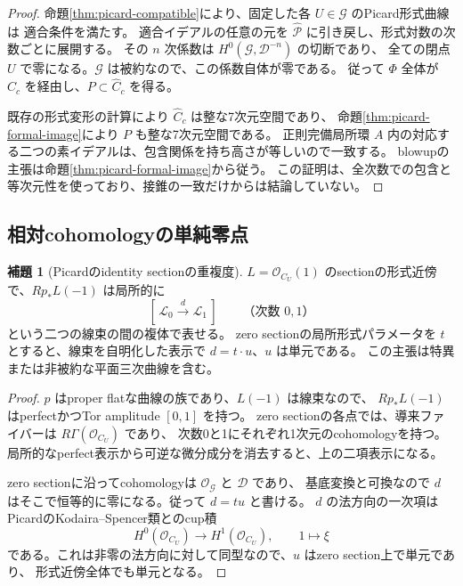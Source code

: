 \documentclass[a4paper,11pt]{ltjsarticle}
\theoremstyle{definition}
\newtheorem{lemma}[theorem]{補題}
\newcommand{\OO}{\mathcal O}
\begin{document}
\begin{proof}
命題\ref{thm:picard-compatible}により、固定した各 $U\in\mathcal G$ のPicard形式曲線は
適合条件を満たす。
適合イデアルの任意の元を $\widehat{\mathcal P}$ に引き戻し、形式対数の次数ごとに展開する。
その $n$ 次係数は $H^0(\mathcal G,\mathcal D^{-n})$ の切断であり、
全ての閉点 $U$ で零になる。$\mathcal G$ は被約なので、この係数自体が零である。
従って $\Phi$ 全体が $\widehat C_c$ を経由し、$P\subset\widehat C_c$ を得る。

既存の形式変形の計算により $\widehat C_c$ は整な7次元空間であり、
命題\ref{thm:picard-formal-image}により $P$ も整な7次元空間である。
正則完備局所環 $A$ 内の対応する二つの素イデアルは、包含関係を持ち高さが等しいので一致する。
blowupの主張は命題\ref{thm:picard-formal-image}から従う。
この証明は、全次数での包含と等次元性を使っており、接錐の一致だけからは結論していない。
\end{proof}

\subsection{相対cohomologyの単純零点}

\begin{lemma}[Picardのidentity sectionの重複度]\label{lem:relative-picard-theta}
$L=\OO_{C_U}(1)$ のsectionの形式近傍で、$Rp_*L(-1)$ は局所的に
\[
 [\,\mathcal L_0\xrightarrow{\,d\,}\mathcal L_1\,]
 \qquad\text{（次数 }0,1\text{）}
\]
という二つの線束の間の複体で表せる。
zero sectionの局所形式パラメータを $t$ とすると、線束を自明化した表示で
$d=t\cdot u$、$u$ は単元である。
この主張は特異または非被約な平面三次曲線を含む。
\end{lemma}

\begin{proof}
$p$ はproper flatな曲線の族であり、$L(-1)$ は線束なので、
$Rp_*L(-1)$ はperfectかつTor amplitude $[0,1]$ を持つ。
zero sectionの各点では、導来ファイバーは $R\Gamma(\OO_{C_U})$ であり、
次数0と1にそれぞれ1次元のcohomologyを持つ。
局所的なperfect表示から可逆な微分成分を消去すると、上の二項表示になる。

zero sectionに沿ってcohomologyは $\OO_{\mathcal G}$ と $\mathcal D$ であり、
基底変換と可換なので $d$ はそこで恒等的に零になる。従って $d=tu$ と書ける。
$d$ の法方向の一次項はPicardのKodaira--Spencer類とのcup積
\[
 H^0(\OO_{C_U})\longrightarrow H^1(\OO_{C_U}),\qquad1\longmapsto\xi
\]
である。これは非零の法方向に対して同型なので、$u$ はzero section上で単元であり、
形式近傍全体でも単元となる。
\end{proof}
\end{document}
